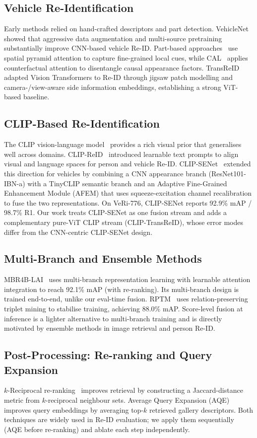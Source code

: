 \documentclass{ieeeaccess}
\begin{document}
\subsection{Vehicle Re-Identification}
Early methods relied on hand-crafted descriptors and part detection.
VehicleNet~\cite{vehiclenet} showed that aggressive data augmentation and
multi-source pretraining substantially improve CNN-based vehicle Re-ID.
Part-based approaches~\cite{hpgn} use spatial pyramid attention to capture
fine-grained local cues, while CAL~\cite{cal} applies counterfactual attention
to disentangle causal appearance factors.
TransReID~\cite{transreid} adapted Vision Transformers to Re-ID through
jigsaw patch modelling and camera-/view-aware side information embeddings,
establishing a strong ViT-based baseline.

\subsection{CLIP-Based Re-Identification}
The CLIP vision-language model~\cite{clip} provides a rich visual prior
that generalises well across domains.
CLIP-ReID~\cite{clipreid} introduced learnable text prompts to align
visual and language spaces for person and vehicle Re-ID.
CLIP-SENet~\cite{clipsenet} extended this direction for vehicles by
combining a CNN appearance branch (ResNet101-IBN-a) with a TinyCLIP
semantic branch and an Adaptive Fine-Grained Enhancement Module (AFEM)
that uses squeeze-excitation channel recalibration to fuse the two
representations. On VeRi-776, CLIP-SENet reports 92.9\% mAP / 98.7\% R1.
Our work treats CLIP-SENet as one fusion stream and adds a complementary
pure-ViT CLIP stream (CLIP-TransReID), whose error modes differ from
the CNN-centric CLIP-SENet design.

\subsection{Multi-Branch and Ensemble Methods}
MBR4B-LAI~\cite{mbr4blai} uses multi-branch representation learning with
learnable attention integration to reach 92.1\% mAP (with re-ranking).
Its multi-branch design is trained end-to-end, unlike our eval-time fusion.
RPTM~\cite{rptm} uses relation-preserving triplet mining to stabilise
training, achieving 88.0\% mAP.
Score-level fusion at inference is a lighter alternative to multi-branch
training and is directly motivated by ensemble methods in image retrieval
and person Re-ID.

\subsection{Post-Processing: Re-ranking and Query Expansion}
$k$-Reciprocal re-ranking~\cite{rerank} improves retrieval by constructing
a Jaccard-distance metric from $k$-reciprocal neighbour sets.
Average Query Expansion (AQE)~\cite{aqe} improves query embeddings
by averaging top-$k$ retrieved gallery descriptors.
Both techniques are widely used in Re-ID evaluation; we apply them
sequentially (AQE before re-ranking) and ablate each step independently.
\end{document}
